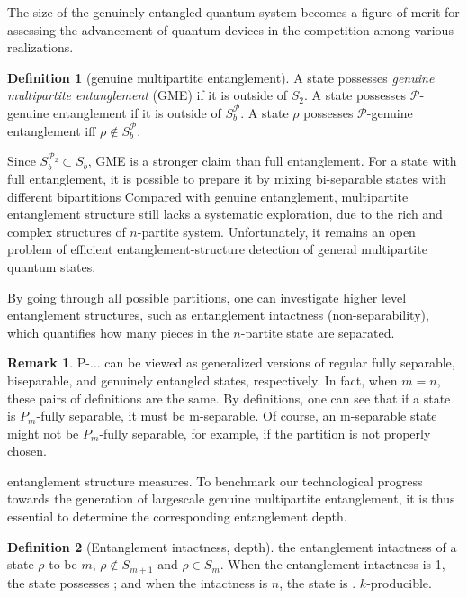 \documentclass[
aps,
pra,
floatfix,
]{revtex4-2}
\theoremstyle{plain}
\theoremstyle{definition}
\newtheorem{definition}{Definition}
\newtheorem{observation}{Observation}
\newtheorem{remark}{Remark}
\newcommand{\ppartition}{\mathcal{P}}
\newcommand{\dm}{\rho}
\begin{document}
The size of the genuinely entangled quantum system becomes a figure of merit for assessing the advancement of quantum devices in the competition among various realizations.
\begin{definition}[genuine multipartite entanglement]\label{def:gme}
	A state possesses \emph{genuine multipartite entanglement} (GME) if it is outside of $S_2$.
	A state possesses $\ppartition$-genuine entanglement if it is outside of $S_b^\ppartition$.
	A state $\dm$ possesses $\ppartition$-genuine entanglement iff $\dm\notin S_b^\ppartition$.
\end{definition}
Since $S_b^{\ppartition_2}\subset S_b$, GME is a stronger claim than full entanglement. 
For a state with full entanglement, it is possible to prepare it by mixing bi-separable states with different bipartitions
	Compared with genuine entanglement, multipartite entanglement structure still lacks a systematic exploration, due to the rich and complex structures of $n$-partite system.
	Unfortunately, it remains an open problem of efficient entanglement-structure detection of general multipartite quantum states.

By going through all possible partitions, one can investigate higher level entanglement structures, such as entanglement intactness (non-separability), which quantifies how many pieces in the $n$-partite state are separated.

\begin{remark}
	P-... can be viewed as generalized versions of regular fully separable, biseparable, and genuinely entangled states, respectively.
	In fact, when $m=n$, these pairs of definitions are the same.
	By definitions, one can see that if a state is $P_m$-fully separable, it must be m-separable. Of course, an m-separable state might not be $P_m$-fully separable, for example, if the partition is not properly chosen.
\end{remark}
entanglement structure measures.
To benchmark our technological progress towards the generation of largescale genuine multipartite entanglement, it is thus essential to determine the corresponding entanglement depth.
\begin{definition}[Entanglement intactness, depth]
	the entanglement intactness of a state $\dm$ to be $m$, \iff $\dm\notin S_{m+1}$ and $\dm\in S_m$.
	When the entanglement intactness is 1, the state possesses ; and when the intactness is $n$, the state is .
	$k$-producible.
\end{definition}
\end{document}
